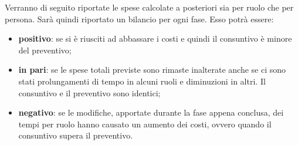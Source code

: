 	Verranno di seguito riportate le spese calcolate a posteriori sia per ruolo che per persona.
	Sarà quindi riportato un bilancio per ogni fase. Esso potrà essere:
	\begin{itemize}
		\item \textbf{positivo}: se si è riusciti ad abbassare i costi e quindi il consuntivo è minore del preventivo;
		\item \textbf{in pari}: se le spese totali previste sono rimaste inalterate anche se ci sono stati prolungamenti di tempo in alcuni ruoli e diminuzioni in altri. Il consuntivo e il preventivo sono identici;
		\item \textbf{negativo}: se le modifiche, apportate durante la fase appena conclusa, dei tempi per ruolo hanno causato un aumento dei costi, ovvero quando il consuntivo supera il preventivo.
	\end{itemize}
	
						
						

